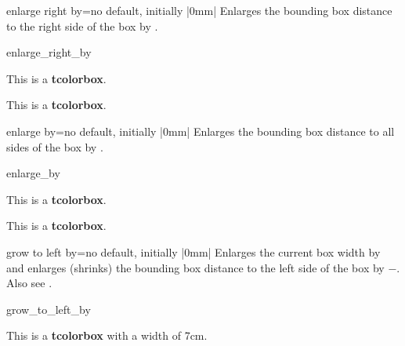 \begin{docTcbKey}{enlarge right by}{=}{no default, initially |0mm|}
  Enlarges the bounding box distance to the right side of the box by .
\begin{exdispExample}[safety=2cm]{enlarge_right_by}

\begin{tcolorbox}[enlarge right by=-2cm,width=\linewidth+2cm,
  enhanced,show bounding box]
This is a \textbf{tcolorbox}.
\end{tcolorbox}
\begin{tcolorbox}[enlarge right by=2cm,width=\linewidth-2cm]
This is a \textbf{tcolorbox}.
\end{tcolorbox}
\end{exdispExample}
\end{docTcbKey}

\clearpage
\begin{docTcbKey}{enlarge by}{=}{no default, initially |0mm|}
  Enlarges the bounding box distance to all sides of the box by .
\begin{exdispExample}{enlarge_by}

\begin{tcolorbox}
This is a \textbf{tcolorbox}.
\end{tcolorbox}
\begin{tcolorbox}[enlarge by=5mm,enhanced,show bounding box]
This is a \textbf{tcolorbox}.
\end{tcolorbox}
\end{exdispExample}
\end{docTcbKey}



\begin{docTcbKey}{grow to left by}{=}{no default, initially |0mm|}
  Enlarges the current box width by  and
  enlarges (shrinks) the bounding box distance to the left side of the box by
  $-$. Also see .
\begin{exdispExample}[safety=2cm]{grow_to_left_by}

\begin{tcolorbox}[width=5cm,grow to left by=2cm,enhanced,show bounding box]
This is a \textbf{tcolorbox} with a width of 7cm.
\end{tcolorbox}
\end{exdispExample}
\end{docTcbKey}

